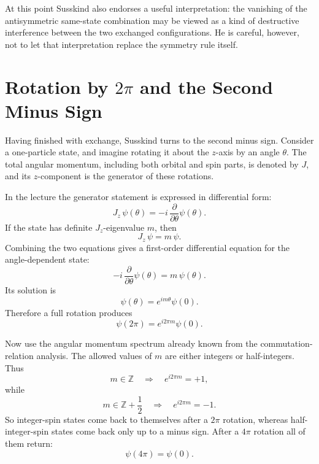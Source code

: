 At this point Susskind also endorses a useful interpretation: the vanishing of the antisymmetric same-state combination may be viewed as a kind of destructive interference between the two exchanged configurations. He is careful, however, not to let that interpretation replace the symmetry rule itself.

\section{Rotation by \(2\pi\) and the Second Minus Sign}

Having finished with exchange, Susskind turns to the second minus sign. Consider a one-particle state, and imagine rotating it about the \(z\)-axis by an angle \(\theta\). The total angular momentum, including both orbital and spin parts, is denoted by \(J\), and its \(z\)-component is the generator of these rotations.

In the lecture the generator statement is expressed in differential form:
\begin{equation}
J_z\,\psi(\theta)=-i\,\frac{\partial}{\partial\theta}\psi(\theta).
\end{equation}
If the state has definite \(J_z\)-eigenvalue \(m\), then
\begin{equation}
J_z\,\psi=m\,\psi.
\end{equation}
Combining the two equations gives a first-order differential equation for the angle-dependent state:
\begin{equation}
-i\,\frac{\partial}{\partial\theta}\psi(\theta)=m\,\psi(\theta).
\end{equation}
Its solution is
\begin{equation}
\psi(\theta)=e^{im\theta}\psi(0).
\end{equation}
Therefore a full rotation produces
\begin{equation}
\psi(2\pi)=e^{i2\pi m}\psi(0).
\end{equation}

Now use the angular momentum spectrum already known from the commutation-relation analysis. The allowed values of \(m\) are either integers or half-integers. Thus
\begin{equation}
m\in \mathbb{Z} \quad \Rightarrow \quad e^{i2\pi m}=+1,
\end{equation}
while
\begin{equation}
m\in \mathbb{Z}+\frac12 \quad \Rightarrow \quad e^{i2\pi m}=-1.
\end{equation}
So integer-spin states come back to themselves after a \(2\pi\) rotation, whereas half-integer-spin states come back only up to a minus sign. After a \(4\pi\) rotation all of them return:
\begin{equation}
\psi(4\pi)=\psi(0).
\end{equation}

